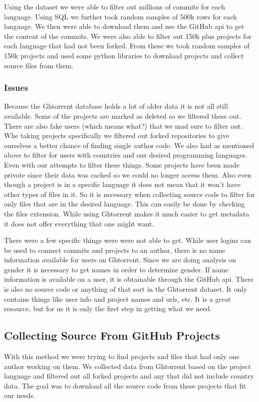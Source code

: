 \documentclass{article}
\begin{document}
Using the dataset we were able to filter out millions of commits for each language. Using SQL we further took random samples of 500k rows for each language. We then were able to download them and use the GitHub api to get the content of the commits. We were also able to filter out 150k plus projects for each language that had not been forked. From these we took random samples of 150k projects and used some python libraries to download projects and collect source files from them.

\subsubsection{Issues}
Because the Ghtorrent database holds a lot of older data it is not all still available. Some of the projects are marked as deleted so we filtered these out. There are also fake users (which means what?) that we mad sure to filter out. Whe taking projects specifically we filtered out forked repositories to give ourselves a better chance of finding single author code. We also had as mentioned above to filter for users with countries and our desired programming languages. Even with our attempts to filter these things. Some projects have been made private since their data was cached so we could no longer access them. Also even though a project is in a specific language it does not mean that it won't have other types of files in it. So it is necessary when collecting source code to filter for only files that are in the desired language. This can easily be done by checking the files extension. While using Ghtorrent makes it much easier to get metadata it does not offer everything that one might want.

There were a few specific things were were not able to get. While user logins can be used to connect commits and projects to an author, there is no name information available for users on Ghtorrent. Since we are doing analysis on gender it is necessary to get names in order to determine gender. If name information is available on a user, it is obtainable through the GitHub api. There is also no source code or anything of that sort in the Ghtorrent dataset. It only contains things like user info and project names and urls, etc. It is a great resource, but for us it is only the first step in getting what we need.



\subsection{Collecting Source From GitHub Projects}
With this method we were trying to find projects and files that had only one author working on them. We collected data from Ghtorrent based on the project language and filtered out all forked projects and any that did not include country data. The goal was to download all the source code from these projects that fit our needs.
\end{document}
